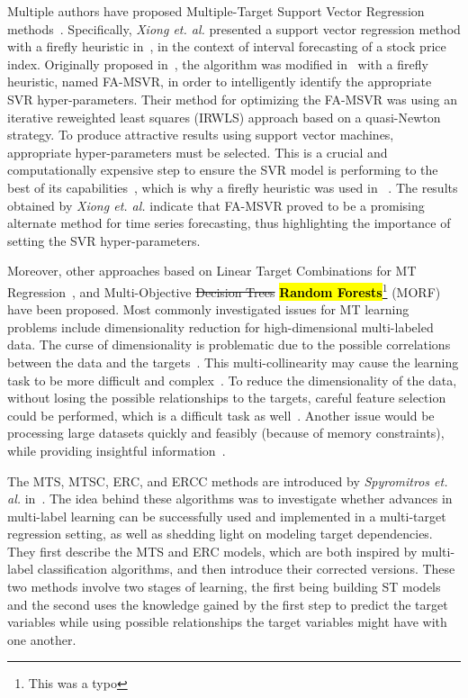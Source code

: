 \documentclass[preprint,12pt]{elsarticle}
\begin{document}
Multiple authors have proposed Multiple-Target Support Vector Regression methods~\cite{Borchani2015,Xiong2014,Xu2013}. Specifically, \textit{Xiong et. al.} presented a support vector regression method with a firefly heuristic in~\cite{Xiong2014}, in the context of interval forecasting of a stock price index. Originally proposed in~\cite{msvr}, the algorithm was modified in~\cite{Xiong2014} with a firefly heuristic, named FA-MSVR, in order to intelligently identify the appropriate SVR hyper-parameters. Their method for optimizing the FA-MSVR was using an iterative reweighted least squares (IRWLS) approach based on a quasi-Newton strategy. To produce attractive results using support vector machines, appropriate hyper-parameters must be selected. This is a crucial and computationally expensive step to ensure the SVR model is performing to the best of its capabilities~\cite{Zhao2015160}, which is why a firefly heuristic was used in ~\cite{Xiong2014}. The results obtained by \textit{Xiong et. al.} indicate that FA-MSVR proved to be a promising alternate method for time series forecasting, thus highlighting the importance of setting the SVR hyper-parameters. 

Moreover, other approaches based on Linear Target Combinations for MT Regression~\cite{Tsoumakas2014}, and Multi-Objective \st{Decision Trees} \hl{\textbf{Random Forests}}\footnote{This was a typo} (MORF)~\cite{Kocev2007} have been proposed. Most commonly investigated issues for MT learning problems include dimensionality reduction for high-dimensional multi-labeled data. The curse of dimensionality is problematic due to the possible correlations between the data and the targets~\cite{Charte20141842,Ding20152521,He2011}. This multi-collinearity may cause the learning task to be more difficult and complex~\cite{Qian2015594}. To reduce the dimensionality of the data, without losing the possible relationships to the targets, careful feature selection could be performed, which is a difficult task as well~\cite{Lee201580,Li2016827}. Another issue would be processing large datasets quickly and feasibly (because of memory constraints), while providing insightful information~\cite{Borchani2015, 2016-INS-LAIM}.

The MTS, MTSC, ERC, and ERCC methods are introduced by \textit{Spyromitros et. al.} in~\cite{Spyromitros2014}. The idea behind these algorithms was to investigate whether advances in multi-label learning can be successfully used and implemented in a multi-target regression setting, as well as shedding light on modeling target dependencies. They first describe the MTS and ERC models, which are both inspired by multi-label classification algorithms, and then introduce their corrected versions. These two methods involve two stages of learning, the first being building ST models and the second uses the knowledge gained by the first step to predict the target variables while using possible relationships the target variables might have with one another. 
\end{document}
